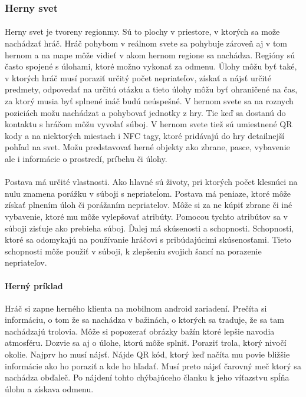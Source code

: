 \subsubsection{Herny svet}
\paragraph{}
Herny svet je tvoreny regionmy. Sú to plochy v priestore, v ktorých sa može nachádzať hráč. Hráč pohybom v reálnom svete sa pohybuje zároveň aj v tom hernom a na mape môže vidieť v akom hernom regione sa nachádza. Regióny sú často spojené s úlohami, ktoré možno vykonať za odmenu. Úlohy môžu byť také, v ktorých hráč musí poraziť určitý počet nepriateľov, získať a nájsť určité predmety, odpovedať na určitú otázku a tieto úlohy môžu byť ohraničené na čas, za ktorý musia byť splnené ináč budú neúspešné. V hernom svete sa na roznych poziciách možu nachádzat a pohybovať jednotky z hry. Tie keď sa dostanú do kontaktu s hráčom môžu vyvolať súboj. V hernom svete tiež sú umiestnené QR kody a na niektorých miestach i NFC tagy, ktoré pridávajú do hry detailnejší pohľad na svet. Možu predstavovať herné objekty ako zbrane, pasce, vybavenie ale i informácie o prostredí, príbehu či úlohy. 

\paragraph{}
Postava má určité vlastnosti. Ako hlavné sú životy, pri ktorých počet klesnúci na nulu znamena porážku v súboji s nepriateĺom. Postava má peniaze, ktoré môže získať plnením úloh či porážaním nepriatelov. Môže si za ne kúpiť zbrane či iné vybavenie, ktoré mu môže vylepšovať atribúty. Pomocou tychto atribútov sa v súboji zisťuje ako prebieha súboj. Ďalej má skúsenosti a schopnosti. Schopnosti, ktoré sa odomykajú na používanie hráčovi s pribúdajúcimi skúsenosťami. Tieto schopnosti môže použiť v súboji, k zlepšeniu svojich šancí na porazenie nepriateľov. 

\paragraph{Herný príklad}
Hráč si zapne herného klienta na mobilnom android zariadení. Prečíta si informáciu, o tom že sa nachádza v bažinách, o ktorých sa traduje, že sa tam nachádzajú trolovia. Môže si popozerať obrázky bažín ktoré lepšie navodia atmosféru. Dozvie sa aj o úlohe, ktorú môže splniť. Poraziť trola, ktorý nivočí okolie. Najprv ho musí nájsť. Nájde QR kód, ktorý keď načíta mu povie bližšie informácie ako ho poraziť a kde ho hľadať. Musí preto nájsť čarovný meč ktorý sa nachádza obďaleč. Po nájdení tohto chýbajúceho članku k jeho víťazstvu spĺňa úlohu a získava odmenu.
